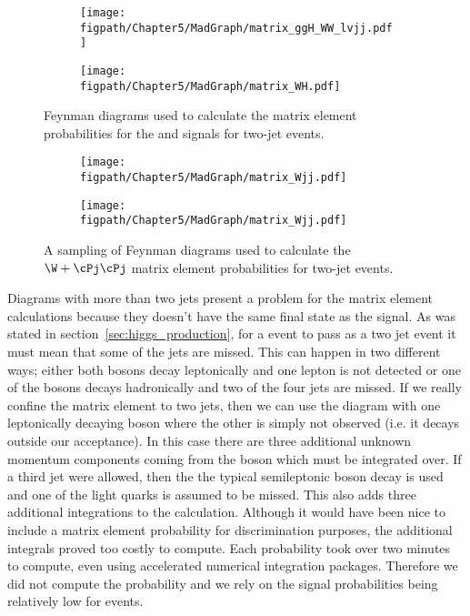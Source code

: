\begin{figure}[!hbt]
    \centering
    \begin{subfigure}[t]{0.48\textwidth}
        \texttt{[image: \\figpath/Chapter5/MadGraph/matrix\_ggH\_WW\_lvjj.pdf]}
    \end{subfigure}
    \begin{subfigure}[t]{0.48\textwidth}
        \texttt{[image: \\figpath/Chapter5/MadGraph/matrix\_WH.pdf]}
    \end{subfigure}
    \caption{Feynman diagrams used to calculate the matrix element probabilities for the \ggH and \WH signals for two-jet events.}
    \label{fig:MadGraph5_example_signal}
\end{figure}

\begin{figure}[!hbtp]
    \centering
    \begin{subfigure}[t]{0.9\textwidth}
        \texttt{[image: \\figpath/Chapter5/MadGraph/matrix\_Wjj.pdf]}
    \end{subfigure}

    \begin{subfigure}[t]{0.9\textwidth}
        \texttt{[image: \\figpath/Chapter5/MadGraph/matrix\_Wjj.pdf]}
    \end{subfigure}
    \caption{A sampling of Feynman diagrams used to calculate the $\W+\cPj\cPj$ matrix element probabilities for two-jet events.}
    \label{fig:MadGraph5_example_Wjj}
\end{figure}

Diagrams with more than two jets present a problem for the matrix element calculations because they doesn't have the same final state as the signal.
As was stated in section~\ref{sec:higgs_production}, for a \ttbar event to pass as a two jet event it must mean that some of the jets are missed.
This can happen in two different ways; either both \W bosons decay leptonically and one lepton is not detected or one of the \W bosons decays hadronically and two of the four jets are missed.
If we really confine the matrix element to two jets, then we can use the diagram with one leptonically decaying \W boson where the other \W is simply not observed (i.e. it decays outside our acceptance).
In this case there are three additional unknown momentum components coming from the \W boson which must be integrated over.
If a third jet were allowed, then the the typical semileptonic \W boson decay is used and one of the light quarks is assumed to be missed.
This also adds three additional integrations to the calculation.
Although it would have been nice to include a \ttbar matrix element probability for discrimination purposes, the additional integrals proved too costly to compute.
Each \ttbar probability took over two minutes to compute, even using accelerated numerical integration packages.
Therefore we did not compute the \ttbar probability and we rely on the signal probabilities being relatively low for \ttbar events.

